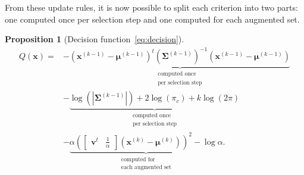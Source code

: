 \documentclass[journal]{IEEEtran}
\newtheorem{prop}{Proposition}
\begin{document}
        From these update rules, it is now possible to split each criterion into two parts: one computed once per selection step and one computed for each augmented set.

        \begin{prop}[Decision function~\ref{eq:decision}]
            \begin{align}
            \label{eq:q-update}
                Q(\mathbf{x}) = &- \underbrace{(\mathbf{x}^{(k-1)} - \boldsymbol{\mu}^{(k-1)})^t (\boldsymbol{\Sigma}^{(k-1)})^{-1} (\mathbf{x}^{(k-1)} - \boldsymbol{\mu}^{(k-1)})}_{\substack{\text{computed once}\\ \text{per selection step}}} \nonumber \\
                &- \underbrace{\log \left(|\boldsymbol{\Sigma}^{(k-1)}|\right) + 2 \log (\pi_c) + k \log(2 \pi)}_{\substack{\text{computed once}\\ \text{per selection step}}} \nonumber \\
                &- \underbrace{\alpha \left( \left[\begin{array}{cc} \mathbf{v}^t & \frac{1}{\alpha} \end{array}\right] (\mathbf{x}^{(k)} - \boldsymbol{\mu}^{(k)}) \right)^2 - \log \alpha}_{\substack{\text{computed for} \\ \text{each augmented set}}}.
            \end{align}
        \end{prop}
\end{document}

